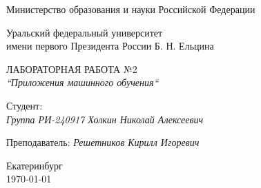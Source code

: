 \thispagestyle{empty}

\begin{center}
	Министерство образования и науки Российской Федерации
	
	\vspace{20pt}
	
	Уральский федеральный университет \\
	имени первого Президента России Б. Н. Ельцина
	
	\vspace{20pt}

\end{center}

\vfill

\begin{center}
	ЛАБОРАТОРНАЯ РАБОТА №2 \\
	\textit{``Приложения машинного обучения``}
	
	\vspace{20pt}
\end{center}

\vfill

	\noindent Студент: \\
	\textit{Группа РИ-240917 \hfill Холкин Николай Алексеевич}
	
	\vspace{5pt}
	
	\noindent Преподаватель: 
	\textit{\hfill Решетников Кирилл Игоревич}
	
	\vspace{20pt}

\vfill

\begin{center}
	Екатеринбург \\ \today
\end{center}

\newpage